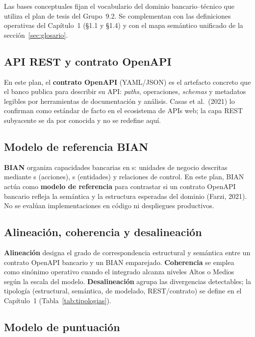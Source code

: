Las bases conceptuales fijan el vocabulario del dominio bancario--técnico que utiliza el plan de
tesis del Grupo~9.2. Se complementan con las definiciones operativas del Capítulo~1 (§1.1 y §1.4) y
con el mapa semántico unificado de la sección~\ref{sec:glosario}.

\subsection{API REST y contrato OpenAPI}

En este plan, el \textbf{contrato OpenAPI} (YAML/JSON) es el artefacto concreto que el banco
publica para describir su API: \textit{paths}, operaciones, \textit{schemas} y metadatos legibles
por herramientas de documentación y análisis. Casas et al.\ (2021) lo confirman como estándar de
facto en el ecosistema de APIs web; la capa REST subyacente se da por conocida y no se redefine aquí.

\subsection{Modelo de referencia BIAN}

\textbf{BIAN} organiza capacidades bancarias en \ServiceDomain{}s: unidades de negocio descritas
mediante \Behavior{}s (acciones), \BusinessObject{}s (entidades) y relaciones de control. En este
plan, BIAN actúa como \textbf{modelo de referencia} para contrastar si un contrato OpenAPI bancario
refleja la semántica y la estructura esperadas del dominio (Farzi, 2021). No se evalúan
implementaciones en código ni despliegues productivos.

\subsection{Alineación, coherencia y desalineación}

\textbf{Alineación} designa el grado de correspondencia estructural y semántica entre un contrato
OpenAPI bancario y un \ServiceDomain{} BIAN emparejado. \textbf{Coherencia} se emplea como sinónimo
operativo cuando el \AlignmentScore{} integrado alcanza niveles Altos o Medios según la escala del
modelo. \textbf{Desalineación} agrupa las divergencias detectables; la tipología (estructural,
semántica, de modelado, REST/contrato) se define en el Capítulo~1 (Tabla~\ref{tab:tipologias}).

\subsection{Modelo de puntuación}

